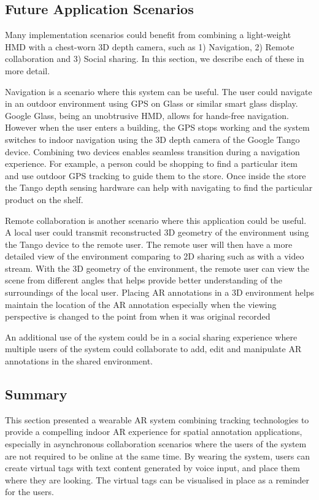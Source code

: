 \subsection{Future Application Scenarios}

Many implementation scenarios could benefit from combining a light-weight HMD with a chest-worn 3D depth camera, such as 1) Navigation, 2) Remote collaboration and 3) Social sharing. In this section, we describe each of these in more detail.

Navigation is a scenario where this system can be useful. The user could navigate in an outdoor environment using GPS on Glass or similar smart glass display. Google Glass, being an unobtrusive HMD, allows for hands-free navigation. However when the user enters a building, the GPS stops working and the system switches to indoor navigation using the 3D depth camera of the Google Tango device. Combining two devices enables seamless transition during a navigation experience. For example, a person could be shopping to find a particular item and use outdoor GPS tracking to guide them to the store. Once inside the store the Tango depth sensing hardware can help with navigating to find the particular product on the shelf.

Remote collaboration is another scenario where this application could be useful. A local user could transmit reconstructed 3D geometry of the environment using the Tango device to the remote user. The remote user will then have a more detailed view of the environment comparing to 2D sharing such as with a video stream. With the 3D geometry of the environment, the remote user can view the scene from different angles that helps provide better understanding of the surroundings of the local user. Placing AR annotations in a 3D environment helps maintain the location of the AR annotation especially when the viewing perspective is changed to the point from when it was original recorded

An additional use of the system could be in a social sharing experience where multiple users of the system could collaborate to add, edit and manipulate AR annotations in the shared environment. 

\subsection{Summary}

This section presented a wearable AR system combining tracking technologies to provide a compelling indoor AR experience for spatial annotation applications, especially in asynchronous collaboration scenarios where the users of the system are not required to be online at the same time. By wearing the system, users can create virtual tags with text content generated by voice input, and place them where they are looking. The virtual tags can be visualised in place as a reminder for the users.  
